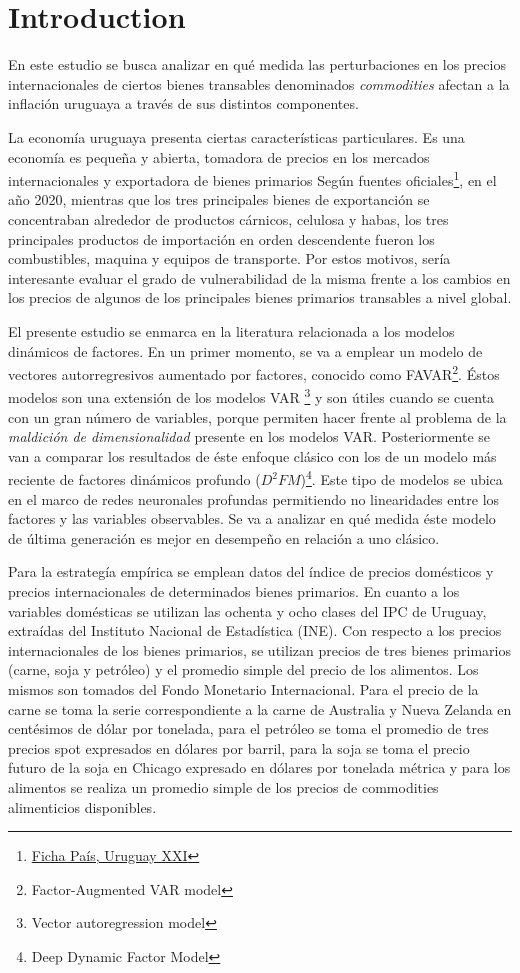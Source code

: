 \chapter{Introduction}\label{chap:intro}

En este estudio se busca analizar en qué medida las perturbaciones en los precios internacionales de ciertos bienes transables denominados \textit{commodities} afectan a la inflación uruguaya a través de sus distintos componentes. 

La economía uruguaya presenta ciertas características particulares. Es una economía es pequeña y abierta, tomadora de precios en los mercados internacionales y exportadora de bienes primarios  Según fuentes oficiales\footnote{\href{https://fichapais.uruguayxxi.gub.uy/}{Ficha País, Uruguay XXI}}, en el año 2020, mientras que los tres principales bienes de exportanción se concentraban alrededor de productos cárnicos, celulosa y habas, los tres principales productos de importación en orden descendente fueron los combustibles, maquina y equipos de transporte. Por estos motivos,  sería interesante evaluar el grado de vulnerabilidad de la misma frente a los cambios en los precios de algunos de los principales bienes primarios transables a nivel global.


El presente estudio se enmarca en la literatura relacionada a los modelos dinámicos de factores. En un primer momento, se va a emplear un modelo de vectores autorregresivos aumentado por factores, conocido como FAVAR\footnote{Factor-Augmented VAR model}. Éstos modelos son una extensión de los modelos VAR \footnote{ Vector autoregression model} 
y son útiles cuando se cuenta con un gran número de variables, porque permiten hacer frente al problema de la \textit{maldición de dimensionalidad} presente en los modelos VAR. Posteriormente se van a comparar los resultados de éste enfoque clásico con los de un modelo más reciente de factores dinámicos profundo ($D^2FM$)\footnote{Deep Dynamic Factor Model}. Este tipo de modelos se ubica en el marco de redes neuronales profundas permitiendo no linearidades entre los factores y las variables observables. Se va a analizar en qué medida éste modelo de última generación es mejor en desempeño en relación a uno clásico.

Para la estrategía empírica se emplean datos del índice de precios domésticos y precios internacionales de determinados bienes primarios. En cuanto a los variables domésticas se utilizan las ochenta y ocho clases del IPC de Uruguay, extraídas del Instituto Nacional de Estadística (INE).  Con respecto a los precios internacionales de los bienes primarios, se utilizan precios de tres bienes primarios (carne, soja y petróleo) y el promedio simple del precio de los alimentos. Los mismos son tomados del Fondo Monetario Internacional. Para el precio de la carne se toma la serie correspondiente a la carne de Australia y Nueva Zelanda en centésimos de dólar por tonelada, para el petróleo se toma el promedio de tres precios spot expresados en dólares por barril, para la soja
se toma el precio futuro de la soja en Chicago expresado en dólares por tonelada
métrica  y para los alimentos se realiza un promedio simple de los precios de commodities alimenticios disponibles. 